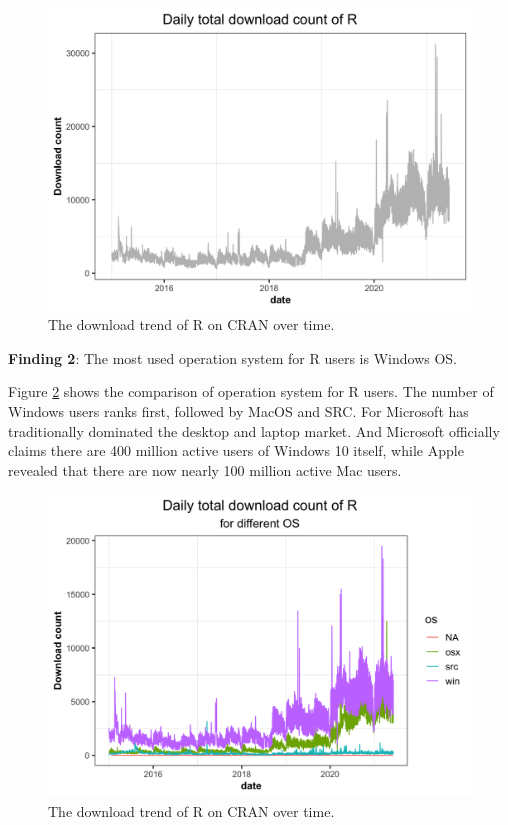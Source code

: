\documentclass[
]{book}
\newenvironment{discovery}[1]{%
  \begin{tcolorbox}[colback=blue!30,colframe=blue!80!black]#1}{\end{tcolorbox}}
\begin{document}
\begin{figure}

{\centering \includegraphics{figures/R-download-trend-1} 

}

\caption{The download trend of R on CRAN over time.}\label{fig:R-download-trend}
\end{figure}

\begin{discovery}
\textbf{Finding 2}: The most used operation system for R users is
Windows OS.
\end{discovery}

Figure \ref{fig:R-download-trend-os} shows the comparison of operation system for R users. The number of Windows users ranks first, followed by MacOS and SRC. For Microsoft has traditionally dominated the desktop and laptop market. And Microsoft officially claims there are 400 million active users of Windows 10 itself, while Apple revealed that there are now nearly 100 million active Mac users.\autocite{warren2017}



\begin{figure}

{\centering \includegraphics{figures/R-download-trend-os-1} 

}

\caption{The download trend of R on CRAN over time.}\label{fig:R-download-trend-os}
\end{figure}
\end{document}
